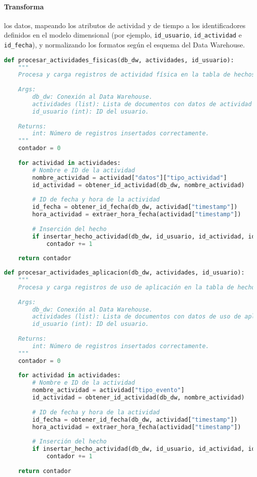 \paragraph{Transforma} los datos, mapeando los atributos de actividad y de tiempo a los identificadores definidos en el modelo dimensional (por ejemplo, \texttt{id\_usuario}, \texttt{id\_actividad} e \texttt{id\_fecha}), y normalizando los formatos según el esquema del Data Warehouse.

\begin{lstlisting}[language=Python]
    def procesar_actividades_fisicas(db_dw, actividades, id_usuario):
    """
    Procesa y carga registros de actividad física en la tabla de hechos.
    
    Args:
        db_dw: Conexión al Data Warehouse.
        actividades (list): Lista de documentos con datos de actividad física.
        id_usuario (int): ID del usuario.
        
    Returns:
        int: Número de registros insertados correctamente.
    """
    contador = 0
    
    for actividad in actividades:
        # Nombre e ID de la actividad
        nombre_actividad = actividad["datos"]["tipo_actividad"]
        id_actividad = obtener_id_actividad(db_dw, nombre_actividad)
        
        # ID de fecha y hora de la actividad
        id_fecha = obtener_id_fecha(db_dw, actividad["timestamp"])
        hora_actividad = extraer_hora_fecha(actividad["timestamp"])
        
        # Inserción del hecho
        if insertar_hecho_actividad(db_dw, id_usuario, id_actividad, id_fecha, hora_actividad):
            contador += 1
    
    return contador
\end{lstlisting}

\begin{lstlisting}[language=Python]
    def procesar_actividades_aplicacion(db_dw, actividades, id_usuario):
    """
    Procesa y carga registros de uso de aplicación en la tabla de hechos.
    
    Args:
        db_dw: Conexión al Data Warehouse.
        actividades (list): Lista de documentos con datos de uso de aplicación.
        id_usuario (int): ID del usuario.
        
    Returns:
        int: Número de registros insertados correctamente.
    """
    contador = 0
    
    for actividad in actividades:
        # Nombre e ID de la actividad
        nombre_actividad = actividad["tipo_evento"]
        id_actividad = obtener_id_actividad(db_dw, nombre_actividad)
        
        # ID de fecha y hora de la actividad
        id_fecha = obtener_id_fecha(db_dw, actividad["timestamp"])
        hora_actividad = extraer_hora_fecha(actividad["timestamp"])
        
        # Inserción del hecho
        if insertar_hecho_actividad(db_dw, id_usuario, id_actividad, id_fecha, hora_actividad):
            contador += 1
    
    return contador

\end{lstlisting}


